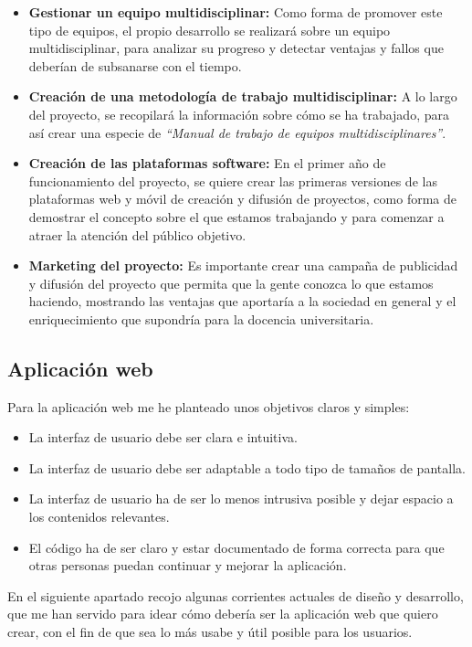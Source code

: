 \begin{itemize}
    \item \textbf{Gestionar un equipo multidisciplinar:} Como forma de promover este tipo de equipos, el propio desarrollo se realizará sobre un equipo multidisciplinar, para analizar su progreso y detectar ventajas y fallos que deberían de subsanarse con el tiempo.
    \item \textbf{Creación de una metodología de trabajo multidisciplinar:} A lo largo del proyecto, se recopilará la información sobre cómo se ha trabajado, para así crear una especie de \textit{``Manual de trabajo de equipos multidisciplinares''}.
    \item \textbf{Creación de las plataformas software:} En el primer año de funcionamiento del proyecto, se quiere crear las primeras versiones de las plataformas web y móvil de creación y difusión de proyectos, como forma de demostrar el concepto sobre el que estamos trabajando y para comenzar a atraer la atención del público objetivo.
    \item \textbf{Marketing del proyecto:} Es importante crear una campaña de publicidad y difusión del proyecto que permita que la gente conozca lo que estamos haciendo, mostrando las ventajas que aportaría a la sociedad en general y el enriquecimiento que supondría para la docencia universitaria.
\end{itemize}

\subsection{Aplicación web}
Para la aplicación web me he planteado unos objetivos claros y simples:

\begin{itemize}
    \item La interfaz de usuario debe ser clara e intuitiva.
    \item La interfaz de usuario debe ser adaptable a todo tipo de tamaños de pantalla.
    \item La interfaz de usuario ha de ser lo menos intrusiva posible y dejar espacio a los contenidos relevantes.
    \item El código ha de ser claro y estar documentado de forma correcta para que otras personas puedan continuar y mejorar la aplicación.
\end{itemize}

En el siguiente apartado recojo algunas corrientes actuales de diseño y desarrollo, que me han servido para idear cómo debería ser la aplicación web que quiero crear, con el fin de que sea lo más usabe y útil posible para los usuarios.

